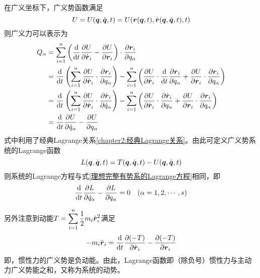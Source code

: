 在广义坐标下，广义势函数满足
\begin{equation*}
	U = U(\boldsymbol{q},\dot{\boldsymbol{q}},t) = U(\boldsymbol{r}(\boldsymbol{q},t),\dot{\boldsymbol{r}}(\boldsymbol{q},\dot{\boldsymbol{q}},t),t)
\end{equation*}
则广义力可以表示为
\begin{align}
	Q_\alpha & = \sum_{i=1}^n \left(\frac{\mathrm{d}}{\mathrm{d} t} \frac{\partial U}{\partial \dot{\boldsymbol{r}}_i} - \frac{\partial U}{\partial \boldsymbol{r}_i}\right) \cdot \frac{\partial \boldsymbol{r}_i}{\partial q_\alpha} \nonumber \\
	& = \frac{\mathrm{d}}{\mathrm{d} t} \left(\sum_{i=1}^n \frac{\partial U}{\partial \dot{\boldsymbol{r}}_i} \cdot \frac{\partial \boldsymbol{r}_i}{\partial q_\alpha} \right) - \sum_{i=1}^n \left(\frac{\partial U}{\partial \dot{\boldsymbol{r}}_i} \cdot \frac{\mathrm{d}}{\mathrm{d} t} \frac{\partial \boldsymbol{r}_i}{\partial q_\alpha} + \frac{\partial U}{\partial \boldsymbol{r}_i} \cdot \frac{\partial \boldsymbol{r}_i}{\partial q_\alpha}\right) \nonumber \\
	& = \frac{\mathrm{d}}{\mathrm{d} t} \left(\sum_{i=1}^n \frac{\partial U}{\partial \dot{\boldsymbol{r}}_i} \cdot \frac{\partial \dot{\boldsymbol{r}}_i}{\partial \dot{q}_\alpha} \right) - \sum_{i=1}^n \left(\frac{\partial U}{\partial \dot{\boldsymbol{r}}_i} \cdot \frac{\partial \dot{\boldsymbol{r}}_i}{\partial q_\alpha} + \frac{\partial U}{\partial \boldsymbol{r}_i} \cdot \frac{\partial \boldsymbol{r}_i}{\partial q_\alpha}\right) \nonumber \\
	& = \frac{\mathrm{d}}{\mathrm{d} t} \frac{\partial U}{\partial \dot{q}_\alpha} - \frac{\partial U}{\partial q_\alpha}
	\label{广义势系统中的广义力}
\end{align}
式中利用了经典Lagrange关系\eqref{chapter2:经典Lagrange关系}。由此可定义广义势系统的Lagrange函数
\begin{equation}
	L(\boldsymbol{q},\dot{\boldsymbol{q}},t) = T(\boldsymbol{q},\dot{\boldsymbol{q}},t) - U(\boldsymbol{q},\dot{\boldsymbol{q}},t)
\end{equation}
则系统的Lagrange方程与式\eqref{理想完整有势系的Lagrange方程}相同，即
\begin{equation}
	\frac{\mathrm{d}}{\mathrm{d}t} \frac{\partial L}{\partial \dot{q}_\alpha} - \frac{\partial L}{\partial q_\alpha} = 0 \quad (\alpha = 1,2,\cdots,s)
\end{equation}

另外注意到动能$\displaystyle T = \sum_{i=1}^n \frac12 m_i \dot{\boldsymbol{r}}_i^2$满足
\begin{equation*}
	-m_i \ddot{\boldsymbol{r}}_i = \frac{\mathrm{d}}{\mathrm{d} t} \frac{\partial (-T)}{\partial \dot{\boldsymbol{r}}_i} - \frac{\partial (-T)}{\partial \boldsymbol{r}_i}
\end{equation*}
即，惯性力的广义势是负动能。由此，Lagrange函数即（除负号）惯性力与主动力广义势能之和，又称为系统的{\heiti 动势}。

